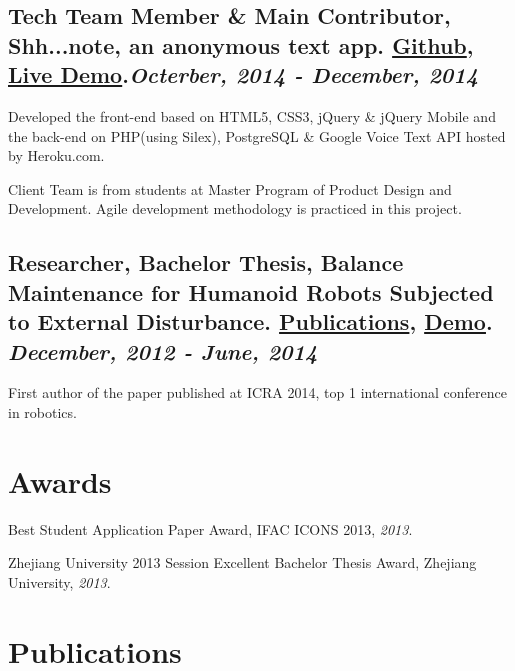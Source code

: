 \documentclass[letterpaper,8pt]{extarticle}
\newlength{\wideitemsep}
\let\olditem\item
\renewcommand{\item}{\setlength{\itemsep}{\wideitemsep}\olditem}
\renewenvironment{itemize}{
  \begin{list}{}{
    \setlength{\leftmargin}{1.5em}
  }
}{
  \end{list}
}
\begin{document}
\subsection*{\textbf{Tech Team Member \& Main Contributor}, Shh...note, an anonymous text app. \href{https://github.com/sabughnaim/AquaMPD}{\color[rgb]{0.2, 0.7, 0.7} Github},  \href{http://sabughnaim.github.io/AquaMPD/web/indexV4.html}{\color[rgb]{0.2, 0.7, 0.7} Live Demo}.\hfill {\it Octerber, 2014 - December, 2014}}
\begin{itemize}
	\item[$\circ$] Developed the front-end based on HTML5, CSS3, jQuery \& jQuery Mobile and the back-end on PHP(using Silex), PostgreSQL \& Google Voice Text API hosted by Heroku.com.
	\item[$\circ$] Client Team is from students at Master Program of Product Design and Development. Agile development methodology is practiced in this project.
\end{itemize}

\subsection*{\textbf{Researcher, Bachelor Thesis}, Balance Maintenance for Humanoid Robots Subjected to External Disturbance. \href{http://yaliang-wang.tk/publications/}{\color[rgb]{0.2, 0.7, 0.7} Publications}, \href{http://yaliang-wang.tk/icra2014-video/}{\color[rgb]{0.2, 0.7, 0.7} Demo}. \hfill {\it December, 2012 - June, 2014}}
\begin{itemize}
	\item[$\circ$] First author of the paper published at ICRA 2014, top 1 international conference in robotics.
\end{itemize}

\section*{Awards \noindent\hrulefill}

\begin{itemize}
  \item[$\circ$] Best Student Application Paper Award, IFAC ICONS 2013, {\it  2013}.
  \item[$\circ$] Zhejiang University 2013 Session Excellent Bachelor Thesis Award, Zhejiang University, {\it  2013}.
\end{itemize}

\section*{Publications \noindent\hrulefill}
\end{document}
